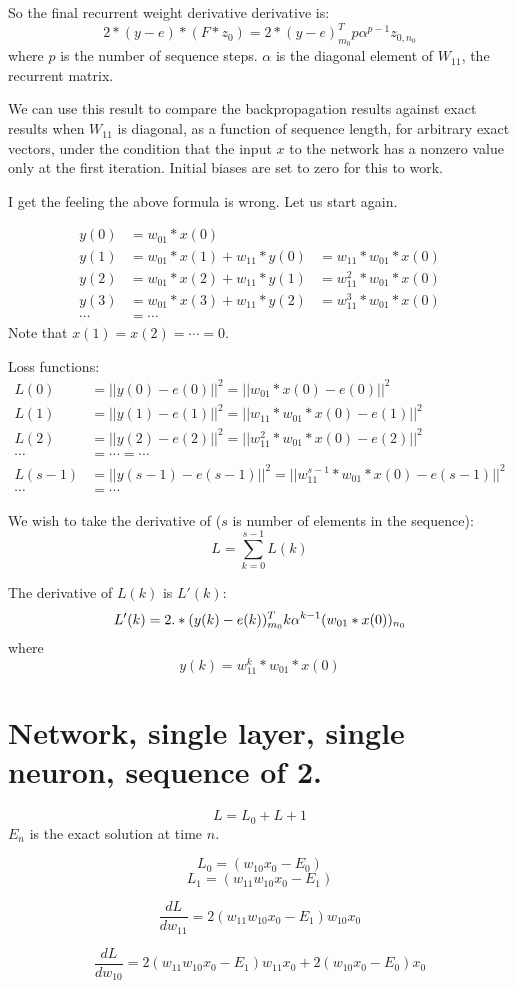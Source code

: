 \documentclass[11pt]{article}
\begin{document}
So the final recurrent weight derivative derivative is: 
$$
2*(y-e) * (F*z_0) = 2*(y-e)^T_{m_0} p \alpha^{p-1} z_{0,n_0}
$$
where $p$ is the number of sequence steps. $\alpha$ is the diagonal element of $W_{11}$, the recurrent matrix. 

We can use this result to compare the backpropagation results against exact results when $W_{11}$ is diagonal, as a function 
of sequence length, for arbitrary exact vectors, under the condition that the input $x$ to the network has a nonzero value
only at the first iteration. Initial biases are set to zero for this to work. 

I get the feeling the above formula is wrong. Let us start again. 

\begin{align}
y(0) &= w_{01}*x(0)  \\
y(1) &= w_{01}*x(1) + w_{11}*y(0) &= w_{11}*w_{01}*x(0) \\
y(2) &= w_{01}*x(2) + w_{11}*y(1) &= w_{11}^2*w_{01}*x(0)\\
y(3) &= w_{01}*x(3) + w_{11}*y(2) &= w_{11}^3*w_{01}*x(0)\\
\cdots &= \cdots 
\end{align}
Note that $x(1) = x(2) = \cdots = 0$. 

Loss functions: 
\begin{align}
L(0) &= ||y(0) - e(0)||^2 = ||w_{01}*x(0)-e(0)||^2\\
L(1) &= ||y(1) - e(1)||^2 = ||w_{11}*w_{01}*x(0) - e(1)||^2 \\
L(2) &= ||y(2) - e(2)||^2 = ||w_{11}^2*w_{01}*x(0) - e(2)||^2 \\
\cdots &= \cdots = \cdots \\
L(s-1) &= ||y(s-1) - e(s-1)||^2 = ||w_{11}^{s-1}*w_{01}*x(0) - e(s-1)||^2 \\
\cdots &= \cdots 
\end{align}

We wish to take the derivative of  ($s$ is number of elements in the sequence): 
$$
L = \sum_{k=0}^{s-1} L(k)
$$

The derivative of $L(k)$ is $L'(k)$: 
$$
L'(k) = 2.*(y(k)-e(k))^T_{m_0} k \alpha^{k-1} (w_{01}*x(0))_{n_0} \\
$$
where 
$$
y(k) = w_{11}^k * w_{01}*x(0)
$$

\section{Network, single layer, single neuron, sequence of 2.}
$$
L = L_0 + L+1
$$
$E_n$ is the exact solution at time $n$.

$$
L_0 = (w_{10} x_0  - E_0)
$$
$$
L_1 = (w_{11}w_{10} x_0 - E_1)
$$

$$
\frac{dL}{dw_{11}} = 2 (w_{11} w_{10} x_0 - E_1) w_{10} x_0
$$

$$
\frac{dL}{dw_{10}} = 2 (w_{11} w_{10} x_0 - E_1) w_{11} x_0
 + 2 (w_{10} x_0 - E_0) x_0
$$
\end{document}

